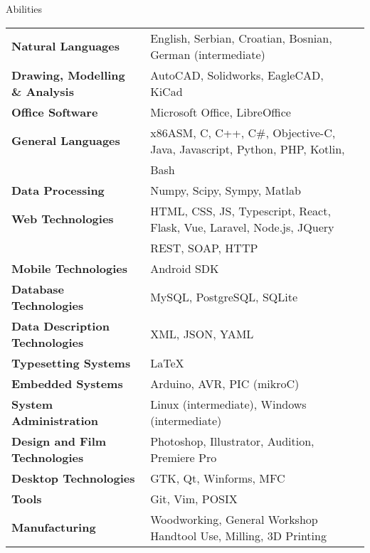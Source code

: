 \documentclass{resume}
\begin{document}
\begin{rSection}{Abilities}
\begin{tabular}{ @{} >{\bfseries}l @{\hspace{6ex}} l }
Natural Languages & English, Serbian, Croatian, Bosnian, German (intermediate)
\\
Drawing, Modelling \& Analysis
    & AutoCAD, Solidworks, EagleCAD, KiCad \\
Office Software
    & Microsoft Office, LibreOffice \\
General Languages
    & x86ASM, C, C++, C\#, Objective-C, Java, Javascript, Python, PHP, Kotlin,\\
    & Bash \\
Data Processing
    & Numpy, Scipy, Sympy, Matlab \\
Web Technologies 
    & HTML, CSS, JS, Typescript, React, Flask, Vue, Laravel, Node.js, JQuery \\
	& REST, SOAP, HTTP \\
Mobile Technologies 
    & Android SDK \\
Database Technologies
    & MySQL, PostgreSQL, SQLite \\
Data Description Technologies
    & XML, JSON, YAML \\
Typesetting Systems 
    & \LaTeX \\
Embedded Systems 
    & Arduino, AVR, PIC (mikroC) \\
System Administration 
    & Linux (intermediate), Windows (intermediate) \\
Design and Film Technologies
    & Photoshop, Illustrator, Audition, Premiere Pro \\
Desktop Technologies 
    & GTK, Qt, Winforms, MFC \\
Tools
    & Git, Vim, POSIX \\
Manufacturing
    & Woodworking, General Workshop Handtool Use, Milling, 3D Printing
\end{tabular}
\end{rSection}
\end{document}
